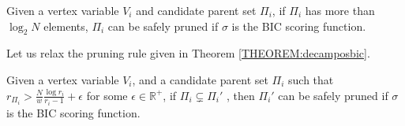\documentclass[letterpaper]{article}
\newcommand{\vertex}[1]{V_{#1}}
\newcommand{\parents}{\Pi}
\newcommand{\ceil}[1]{\lceil #1 \rceil}
\newenvironment{customthm}[1]
  {\renewcommand\theinnercustomthm{#1}\innercustomthm}
  {\endinnercustomthm}
\newenvironment{customcor}[1]
  {\renewcommand\theinnercustomcor{#1}\innercustomcor}
  {\endinnercustomthm}
\begin{document}
\begin{customcor}{3B}
\cite{CamposJ11}
	Given a vertex variable $\vertex{i}$ and candidate parent set 
	$\Pi_i$, if $\Pi_i$ has more than $\log_2 N$ elements,
	$\Pi_i$ can be safely pruned if $\sigma$ is the BIC scoring function. \label{cor:decampossize}
\end{customcor}


	
Let us relax the pruning rule given in Theorem \ref{THEOREM:decamposbic}.


\begin{customthm}{3}
	Given a vertex variable $V_i$, and a candidate parent set $\Pi_i$ such that $r_{\Pi_i}> \frac{N}{w} \frac{\log r_i}{r_i -1} + \epsilon$ for some $\epsilon \in \mathbb{R}^+$,  if $\parents_i \subsetneq \parents_i'$ , then $\parents_i'$ can be safely pruned if $\sigma$ is the BIC scoring function. 
\end{customthm}
\end{document}
